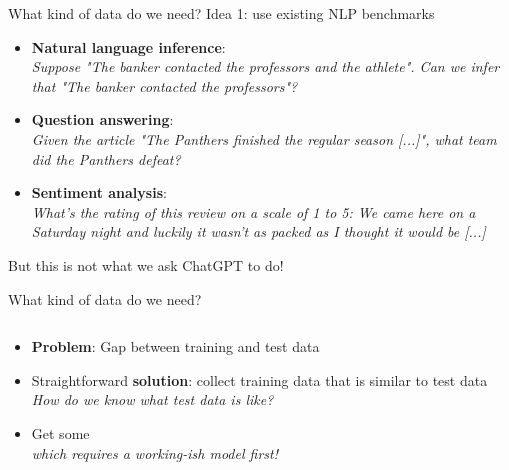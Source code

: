 \documentclass[usenames,dvipsnames,notes,11pt,aspectratio=169,hyperref={colorlinks=true, linkcolor=blue}]{beamer}
\begin{document}
\begin{frame}
    {What kind of data do we need?}
    Idea 1: use existing NLP benchmarks

    \begin{itemize}
        \item \textbf{Natural language inference}:\\
            \textit{
            Suppose "The banker contacted the professors and the athlete". Can we infer that "The banker contacted the professors"?
        }
    \item \textbf{Question answering}:\\
            \textit{
        Given the article "The Panthers finished the regular season [...]", what team did the Panthers defeat?
    }
\item \textbf{Sentiment analysis}:\\
            \textit{
    What's the rating of this review on a scale of 1 to 5:
    We came here on a Saturday night and luckily it wasn't as packed as I thought it would be [...]
}
    \end{itemize}

    \pause
    But this is not what we ask ChatGPT to do! $\quad$ {\bf {}}
\end{frame}

\begin{frame}
    {What kind of data do we need?}
   
    \begin{columns}
        \begin{column}{0.5\textwidth}
            \begin{itemize}[<+->]
                \item {\bf Problem}: Gap between training and test data 
                \item Straightforward {\bf solution}: collect training data that is similar to test data\\
                    {\em How do we know what test data is like?}
                \item Get some \\
                    {\em which requires a working-ish model first!}
            \end{itemize}
        \end{column}
        \begin{column}{0.5\textwidth}
        \end{column}
        \end{columns}
\end{frame}
\end{document}
